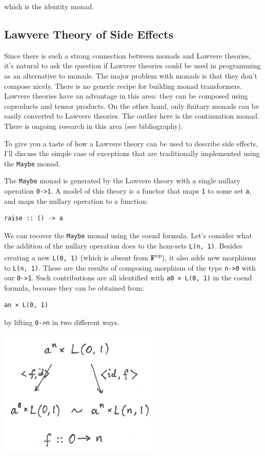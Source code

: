 which is the identity monad.

\subsection{Lawvere Theory of Side
Effects}\label{lawvere-theory-of-side-effects}

Since there is such a strong connection between monads and Lawvere
theories, it's natural to ask the question if Lawvere theories could be
used in programming as an alternative to monads. The major problem with
monads is that they don't compose nicely. There is no generic recipe for
building monad transformers. Lawvere theories have an advantage in this
area: they can be composed using coproducts and tensor products. On the
other hand, only finitary monads can be easily converted to Lawvere
theories. The outlier here is the continuation monad. There is ongoing
research in this area (see bibliography).

To give you a taste of how a Lawvere theory can be used to describe side
effects, I'll discuss the simple case of exceptions that are
traditionally implemented using the \texttt{Maybe} monad.

The \texttt{Maybe} monad is generated by the Lawvere theory with a
single nullary operation \texttt{0-\textgreater{}1}. A model of this
theory is a functor that maps \texttt{1} to some set \texttt{a}, and
maps the nullary operation to a function:

\begin{verbatim}
raise :: () -> a
\end{verbatim}

We can recover the \texttt{Maybe} monad using the coend formula. Let's
consider what the addition of the nullary operation does to the hom-sets
\texttt{L(n,\ 1)}. Besides creating a new \texttt{L(0,\ 1)} (which is
absent from \textbf{F}\textsuperscript{op}), it also adds new morphisms
to \texttt{L(n,\ 1)}. These are the results of composing morphism of the
type \texttt{n-\textgreater{}0} with our \texttt{0-\textgreater{}1}.
Such contributions are all identified with \texttt{a0\ ×\ L(0,\ 1)} in
the coend formula, because they can be obtained from:

\begin{verbatim}
an × L(0, 1)
\end{verbatim}

by lifting \texttt{0-\textgreater{}n} in two different ways.

\includegraphics[width=3.12500in]{images/equalize2.png}


